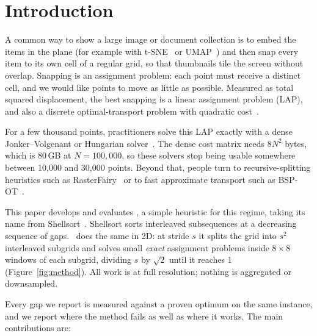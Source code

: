 \section{Introduction}
\label{sec:intro}

A common way to show a large image or document collection is to embed the items in
the plane (for example with t-SNE~\citep{vandermaaten2008tsne} or
UMAP~\citep{mcinnes2018umap}) and then snap every item to its own cell of a regular grid,
so that thumbnails tile the screen without overlap. Snapping is an assignment problem:
each point must receive a distinct cell, and we would like points to move as little as
possible. Measured as total squared displacement, the best snapping is a linear
assignment problem (LAP), and also a discrete optimal-transport problem with quadratic
cost~\citep{peyre2019computational}.

For a few thousand points, practitioners solve this LAP exactly with a dense
Jonker--Volgenant or Hungarian solver~\citep{markovtsev2017jvtsne,mcdonald2016cloudtogrid,
markovtsev_lapjv,kazmar_lap}. The dense cost matrix needs $8N^2$ bytes, which is
80\,GB at $N=100{,}000$, so these solvers stop being usable somewhere between
10{,}000 and 30{,}000 points. Beyond that, people turn to recursive-splitting heuristics
such as RasterFairy~\citep{klingemann2015rasterfairy} or to fast approximate transport
such as BSP-OT~\citep{genest2025bspot}.

This paper develops and evaluates \ShuffleSnap, a simple heuristic for this regime,
taking its name from Shellsort~\citep{shell1959highspeed}. Shellsort sorts interleaved
subsequences at a decreasing sequence of gaps. \ShuffleSnap\ does the same in 2D: at stride $s$
it splits the grid into $s^2$ interleaved subgrids and solves small \emph{exact}
assignment problems inside $8\times8$ windows of each subgrid, dividing $s$ by $\sqrt2$
until it reaches 1 (Figure~\ref{fig:method}). All work is at full resolution; nothing is
aggregated or downsampled.

Every gap we report is measured against a proven optimum on the same instance, and we
report where the method fails as well as where it works. The main contributions are:


